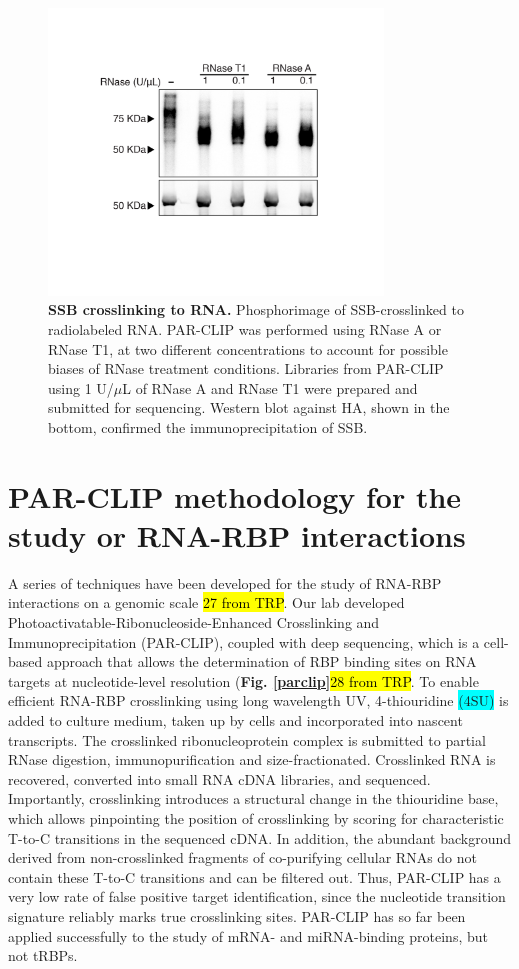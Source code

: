 \documentclass[12pt]{rockefeller}
\newcommand{\cyan}[1]{\colorbox{cyan}{#1}}
\begin{document}
\begin{figure}[!ht]%
\centering
\includegraphics[width=3.5in]{paper2b.png}%
\caption[SSB crosslinking to RNA]
{\textbf{SSB crosslinking to RNA.}
Phosphorimage of SSB-crosslinked to radiolabeled RNA. PAR-CLIP was performed using RNase A or RNase T1, at two different concentrations to 
account for possible biases of RNase treatment conditions. Libraries from PAR-CLIP using 1 U/$\mu$L of RNase A and RNase T1 were prepared and submitted for sequencing. Western blot against HA, shown in the bottom, confirmed the immunoprecipitation of SSB.}
\centering
\label{paper2b}%
\end{figure}

\section{PAR-CLIP methodology for the study or RNA-RBP interactions}
A series of techniques have been developed for the study of RNA-RBP interactions on a genomic scale \hl{27 from TRP}. Our lab developed Photoactivatable-Ribonucleoside-Enhanced Crosslinking and Immunoprecipitation (PAR-CLIP), coupled with deep sequencing, which is a cell-based approach that allows the determination of RBP binding sites on RNA targets at nucleotide-level resolution (\textbf{Fig. \ref{parclip}}\hl{28 from TRP}. To enable efficient RNA-RBP crosslinking using long wavelength UV, 4-thiouridine \cyan{(4SU)} is added to culture medium, taken up by cells and incorporated into nascent transcripts. The crosslinked ribonucleoprotein complex is submitted to partial RNase digestion, immunopurification and size-fractionated. Crosslinked RNA is recovered, converted into small RNA cDNA libraries, and sequenced. Importantly, crosslinking introduces a structural change in the thiouridine base, which allows pinpointing the position of crosslinking by scoring for characteristic T-to-C transitions in the sequenced cDNA. In addition, the abundant background derived from non-crosslinked fragments of co-purifying cellular RNAs do not contain these T-to-C transitions and can be filtered out. Thus, PAR-CLIP has a very low rate of false positive target identification, since the nucleotide transition signature reliably marks true crosslinking sites. PAR-CLIP has so far been applied successfully to the study of mRNA- and miRNA-binding proteins, but not tRBPs. 
\end{document}
